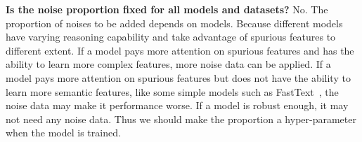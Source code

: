 \noindent\textbf{Is the noise proportion fixed for all models and datasets?} 
No. The proportion of noises to be added depends on models. 
Because different models have varying reasoning capability and 
take advantage of spurious features to different extent. 
If a model pays more attention on spurious features 
and has the ability to learn more complex features, more noise data can be applied. 
If a model pays more attention on spurious features but does not have the 
ability to learn more semantic features, 
like some simple models such as FastText~\cite{joulin2017bag}, 
the noise data may make it performance worse. If 
a model is robust enough, it may not need any noise data.  
Thus we should make the proportion a hyper-parameter when the model is trained.





